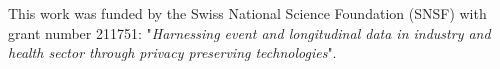 \documentclass[a0,portrait]{a0poster}
\begin{document}
\begin{multicols}{3}
\normalsize
This work was funded by the Swiss National Science Foundation (SNSF) with grant number 211751: "\textit{Harnessing event and longitudinal data in industry and health sector through privacy preserving technologies}".










 
\end{multicols}
\end{document}
